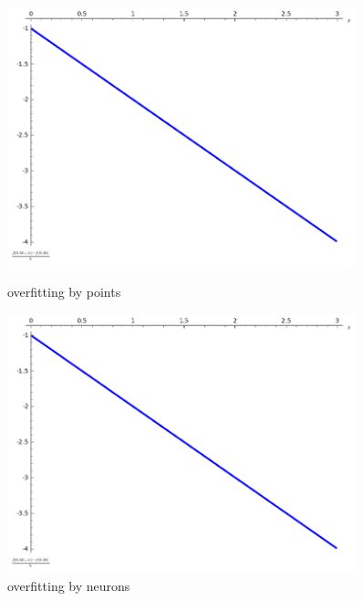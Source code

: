 \documentclass[a4paper]{article}
\begin{document}
\begin{figure}[!ht]
    \centering
    \begin{minipage}{0.45\textwidth}
        \centering
        \includegraphics[width=0.9\textwidth]{illustration1.png} %
        \caption{overfitting by  points}
    \end{minipage}\hfill
    \begin{minipage}{0.45\textwidth}
        \centering
        \includegraphics[width=0.9\textwidth]{illustration1.png} %
        \caption{overfitting by  neurons}
    \end{minipage}
\end{figure}
\end{document}
